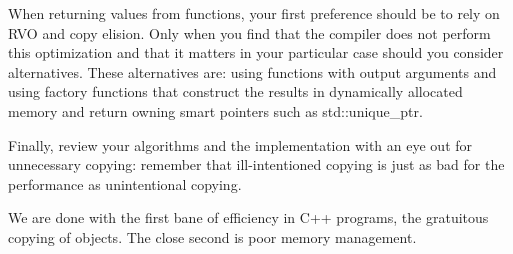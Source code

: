 When returning values from functions, your first preference should be to rely on RVO and copy elision. Only when you find that the compiler does not perform this optimization and that it matters in your particular case should you consider alternatives. These alternatives are: using functions with output arguments and using factory functions that construct the results in dynamically allocated memory and return owning smart pointers such as std::unique\_ptr. 

Finally, review your algorithms and the implementation with an eye out for unnecessary copying: remember that ill-intentioned copying is just as bad for the performance as unintentional copying.

We are done with the first bane of efficiency in C++ programs, the gratuitous copying of objects. The close second is poor memory management.














